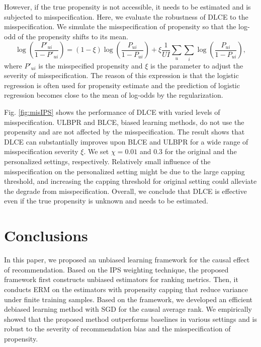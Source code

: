 \documentclass[manuscript,screen]{acmart}
\begin{document}
However, if the true propensity is not accessible, it needs to be estimated and is subjected to misspecification.
Here, we evaluate the robustness of DLCE to the misspecification.
We simulate the misspecification of propensity so that the log-odd of the propensity shifts to its mean.
\begin{equation}
\label{eq:misIPS}
\log \left(\frac{P'_{ui}}{1-P'_{ui}} \right) = (1-\xi)\log \left(\frac{P_{ui}}{1-P_{ui}} \right) + \xi \frac{1}{UI} \sum_u \sum_i \log \left(\frac{P_{ui}}{1-P_{ui}} \right),
\end{equation}
where $P'_{ui}$ is the misspecified propensity and $\xi$ is the parameter to adjust the severity of misspecification.
The reason of this expression is that the logistic regression is often used for propensity estimate and the prediction of logistic regression becomes close to the mean of log-odds by the regularization.

Fig. \ref{fig:misIPS} shows the performance of DLCE with varied levels of misspecification.
ULBPR and BLCE, biased learning methods, do not use the propensity and are not affected by the misspecification.
The result shows that DLCE can substantially improves upon BLCE and ULBPR for a wide range of misspecification severity $\xi$.
We set $\chi=0.01$ and $0.3$ for the original and the personalized settings, respectively.
Relatively small influence of the misspecification on the personalized setting might be due to the large capping threshold, and increasing the capping threshold for original setting could alleviate the degrade from misspecification.
Overall, we conclude that DLCE is effective even if the true propensity is unknown and needs to be estimated.

\section{Conclusions}
In this paper, we proposed an unbiased learning framework for the causal effect of recommendation.
Based on the IPS weighting technique, the proposed framework first constructs unbiased estimators for ranking metrics.
Then, it conducts ERM on the estimators with propensity capping that reduce variance under finite training samples.
Based on the framework, we developed an efficient debiased learning method with SGD for the causal average rank.
We empirically showed that the proposed method outperforms baselines in various settings and is robust to the severity of recommendation bias and the misspecification of propensity.
\end{document}
